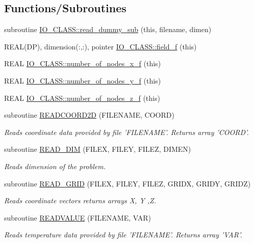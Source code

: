 \subsection*{Functions/Subroutines}
\begin{DoxyCompactItemize}
\item 
subroutine \hyperlink{namespaceIO__CLASS_afb3b43393c81d05f437ae1359acf77d2}{IO\_\-CLASS::read\_\-dummy\_\-sub} (this, filename, dimen)
\item 
REAL(DP), dimension(:,:), pointer \hyperlink{namespaceIO__CLASS_a9fd49cecb24a51f12650f5249285c05f}{IO\_\-CLASS::field\_\-f} (this)
\item 
REAL \hyperlink{namespaceIO__CLASS_a16514873e600c2fbfde6897a92c88d5e}{IO\_\-CLASS::number\_\-of\_\-nodes\_\-x\_\-f} (this)
\item 
REAL \hyperlink{namespaceIO__CLASS_a67cf6d63ec2af6429ed8ef6885ac143a}{IO\_\-CLASS::number\_\-of\_\-nodes\_\-y\_\-f} (this)
\item 
REAL \hyperlink{namespaceIO__CLASS_aa9b327cdca2173b0269ec5007a8ab9f1}{IO\_\-CLASS::number\_\-of\_\-nodes\_\-z\_\-f} (this)
\item 
subroutine \hyperlink{IO_8f90_a8d056690126388abed5afdc417478743}{READCOORD2D} (FILENAME, COORD)
\begin{DoxyCompactList}\small\item\em Reads coordinate data provided by file 'FILENAME'. Returns array 'COORD'. \end{DoxyCompactList}\item 
subroutine \hyperlink{IO_8f90_ad4bcb3bc1474b8196591ffba79abde7a}{READ\_\-DIM} (FILEX, FILEY, FILEZ, DIMEN)
\begin{DoxyCompactList}\small\item\em Reads dimension of the problem. \end{DoxyCompactList}\item 
subroutine \hyperlink{IO_8f90_a72880371212132741d2bddfd1c2a79c7}{READ\_\-GRID} (FILEX, FILEY, FILEZ, GRIDX, GRIDY, GRIDZ)
\begin{DoxyCompactList}\small\item\em Reads coordinate vectors returns arrays X, Y ,Z. \end{DoxyCompactList}\item 
subroutine \hyperlink{IO_8f90_ac5cecf3c7d359ad0dd6cf8ab12c68cb8}{READVALUE} (FILENAME, VAR)
\begin{DoxyCompactList}\small\item\em Reads temperature data provided by file 'FILENAME'. Returns array 'VAR'. \end{DoxyCompactList}\item 

\end{DoxyCompactItemize}
